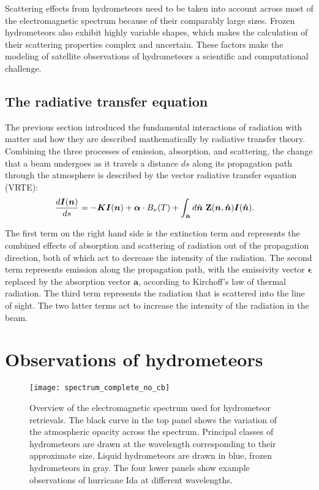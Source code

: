 Scattering effects from hydrometeors need to be taken into account across most
of the electromagnetic spectrum because of their comparably large sizes. Frozen
hydrometeors also exhibit highly variable shapes, which makes the calculation of
their scattering properties complex and uncertain. These factors make the
modeling of satellite observations of hydrometeors a scientific and
computational challenge.

\subsection{The radiative transfer equation}

The previous section introduced the fundamental interactions of radiation
with matter and how they are described mathematically by radiative transfer
theory. Combining the three processes of emission, absorption, and scattering,
the change that a beam undergoes as it travels a distance $ds$ along its
propagation path through the atmosphere is described by the vector radiative
transfer equation (VRTE):
\begin{align}\label{eq:vrte}
  \frac{d\bm{I}(\bm{n})}{ds} &=
  -\bm{K}\bm{I}(\bm{n}) + \bm{\alpha} \cdot B_\nu(T) + \int_{\hat{\bm{n}}} d\hat{\bm{n}} \ \mathbf{Z}(\bm{n}, \bm{\hat{n}}) \bm{I}(\bm{\hat{n}}).
  \end{align}

The first term on the right hand side is the extinction term and represents the
combined effects of absorption and scattering of radiation out of the
propagation direction, both of which act to decrease the intensity of the
radiation. The second term represents emission along the propagation path, with
the emissivity vector $\bm{\epsilon}$ replaced by the absorption vector
$\bm{a}$, according to Kirchoff's law of thermal radiation. The third term
represents the radiation that is scattered into the line of sight. The two
latter terms act to increase the intensity of the radiation in the beam.

\section{Observations of hydrometeors}
%
\begin{figure}[!tbh]
  \centering
  \texttt{[image: spectrum\_complete\_no\_cb]}
  \caption{Overview of the electromagnetic spectrum used for hydrometeor
    retrievals. The black curve in the top panel shows the variation of the
    atmospheric opacity across the spectrum. Principal classes of hydrometeors
    are drawn at the wavelength corresponding to their approximate size.
    Liquid hydrometeors are drawn in blue, frozen hydrometeors in gray.
    The four lower panels show example observations of hurricane Ida at
    different wavelengths.}
  \label{fig:radiative_transfer:spectrum}
\end{figure}

